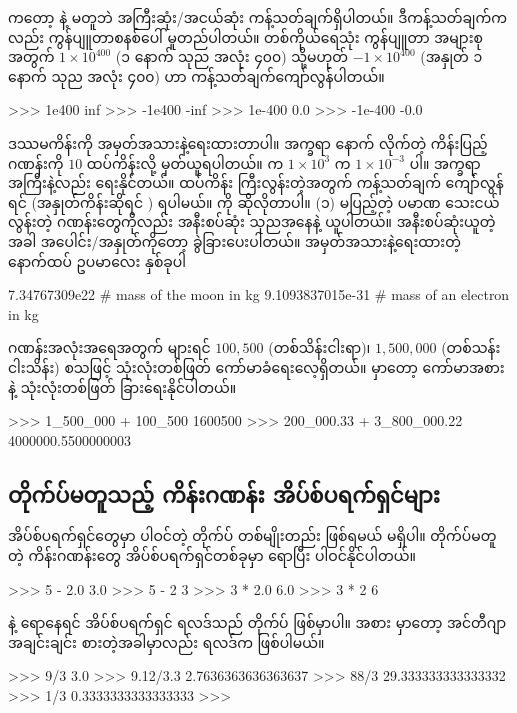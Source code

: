   ကတော့  နဲ့ မတူဘဲ အကြီးဆုံး/အငယ်ဆုံး ကန့်သတ်ချက်ရှိပါတယ်။ ဒီကန့်သတ်ချက်ကလည်း ကွန်ပျူတာစနစ်ပေါ် မူတည်ပါတယ်။ တစ်ကိုယ်ရေသုံး ကွန်ပျူတာ အများစုအတွက် \(1 \times 10^{400}\) (၁ နောက် သုည အလုံး ၄၀၀) သို့မဟုတ် \(-1 \times 10^{400}\) (အနှုတ် ၁ နောက် သုည အလုံး ၄၀၀) ဟာ ကန့်သတ်ချက်ကျော်လွန်ပါတယ်။ 
%
\setlength{\fboxsep}{0pt}
\begin{codetxt}
>>> 1e400
inf
>>> -1e400
-inf
>>> 1e-400
0.0
>>> -1e-400
-0.0
 \end{codetxt}
 ဒဿမကိန်းကို  အမှတ်အသားနဲ့ရေးထားတာပါ။  အက္ခရာ  နောက် လိုက်တဲ့ ကိန်းပြည့်ဂဏန်းကို $10$ ထပ်ကိန်းလို့ မှတ်ယူရပါတယ်။  က \(1 \times 10^{3}\)\fEn{,}  က \(1 \times 10^{-3}\) ပါ။ အက္ခရာ  အကြီးနဲ့လည်း ရေးနိုင်တယ်။ ထပ်ကိန်း ကြီးလွန်းတဲ့အတွက် ကန့်သတ်ချက် ကျော်လွန်ရင်  (အနှုတ်ကိန်းဆိုရင်  ) ရပါမယ်။  ကို ဆိုလိုတာပါ။ (၁) မပြည့်တဲ့ ပမာဏ သေးငယ်လွန်းတဲ့ ဂဏန်းတွေကိုလည်း အနီးစပ်ဆုံး သုညအနေနဲ့ ယူပါတယ်။ အနီးစပ်ဆုံးယူတဲ့အခါ အပေါင်း/အနှုတ်ကိုတော့ ခွဲခြားပေးပါတယ်။  အမှတ်အသားနဲ့ရေးထားတဲ့ နောက်ထပ် ဥပမာလေး နှစ်ခုပါ
%
\setlength{\fboxsep}{0pt}
\begin{codetxt}
7.34767309e22    # mass of the moon in kg
9.1093837015e-31 # mass of an electron in kg
\end{codetxt}
%

ဂဏန်းအလုံးအရေအတွက် များရင် $100,500$ (တစ်သိန်းငါးရာ)၊ $1,500,000$ (တစ်သန်းငါးသိန်း) စသဖြင့် သုံးလုံးတစ်ဖြတ် ကော်မာခံရေးလေ့ရှိတယ်။  မှာတော့ ကော်မာအစား  နဲ့ သုံးလုံးတစ်ဖြတ် ခြားရေးနိုင်ပါတယ်။ 
%
\setlength{\fboxsep}{0pt}
\begin{codetxt}
>>> 1_500_000 + 100_500
1600500
>>> 200_000.33 + 3_800_000.22
4000000.5500000003
\end{codetxt}
%



\subsection*{တိုက်ပ်မတူသည့် ကိန်းဂဏန်း အိပ်စ်ပရက်ရှင်များ}
အိပ်စ်ပရက်ရှင်တွေမှာ ပါဝင်တဲ့ တိုက်ပ် တစ်မျိုးတည်း ဖြစ်ရမယ် မရှိပါ။ တိုက်ပ်မတူတဲ့ ကိန်းဂဏန်းတွေ အိပ်စ်ပရက်ရှင်တစ်ခုမှာ ရောပြီး ပါဝင်နိုင်ပါတယ်။
%
\setlength{\fboxsep}{0pt}
\begin{codetxt}
>>> 5 - 2.0
3.0
>>> 5 - 2
3
>>> 3 * 2.0
6.0
>>> 3 * 2
6
\end{codetxt}
%
 နဲ့  ရောနေရင် အိပ်စ်ပရက်ရှင် ရလဒ်သည်  တိုက်ပ် ဖြစ်မှာပါ။ အစား  မှာတော့ အင်တီဂျာအချင်းချင်း စားတဲ့အခါမှာလည်း ရလဒ်က  ဖြစ်ပါမယ်။ 
%
\setlength{\fboxsep}{0pt}
\begin{codetxt}
>>> 9/3
3.0
>>> 9.12/3.3
2.7636363636363637
>>> 88/3
29.333333333333332
>>> 1/3
0.3333333333333333
>>>
\end{codetxt}
%

